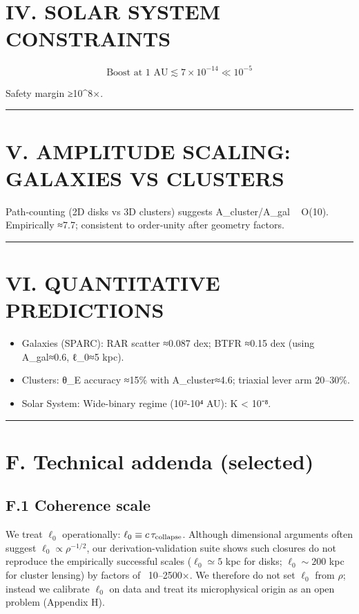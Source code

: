 \documentclass[11pt,a4paper]{article}
\begin{document}
\section{IV. SOLAR SYSTEM CONSTRAINTS}


\begin{equation}
\text{Boost at 1 AU} \lesssim 7\times 10^{-14} \ll 10^{-5}
\end{equation}

Safety margin ≥10^8×.


\medskip\hrule\medskip


\section{V. AMPLITUDE SCALING: GALAXIES VS CLUSTERS}


Path‑counting (2D disks vs 3D clusters) suggests A\_cluster/A\_gal ~ O(10). Empirically ≈7.7; consistent to order‑unity after geometry factors.


\medskip\hrule\medskip


\section{VI. QUANTITATIVE PREDICTIONS}


\begin{itemize}
\item Galaxies (SPARC): RAR scatter ≈0.087 dex; BTFR ≈0.15 dex (using A\_gal≈0.6, ℓ\_0≈5 kpc).
\item Clusters: θ\_E accuracy ≈15\% with A\_cluster≈4.6; triaxial lever arm 20–30\%.
\item Solar System: Wide-binary regime (10²-10⁴ AU): K < 10⁻⁸.
\end{itemize}


\medskip\hrule\medskip


\section{F. Technical addenda (selected)}


\subsection{F.1 Coherence scale}


We treat $\ell_0$ operationally: $\allowbreak \ell_0 \equiv c\,\tau_{\rm collapse}$\allowbreak . Although dimensional arguments often suggest $\ell_0 \propto \rho^{-1/2}$, our derivation-validation suite shows such closures do not reproduce the empirically successful scales ($\ell_0 \simeq 5$ kpc for disks; $\ell_0 \sim 200$ kpc for cluster lensing) by factors of ~10–2500×. We therefore do not set $\ell_0$ from $\rho$; instead we calibrate $\ell_0$ on data and treat its microphysical origin as an open problem (Appendix H).
\end{document}
